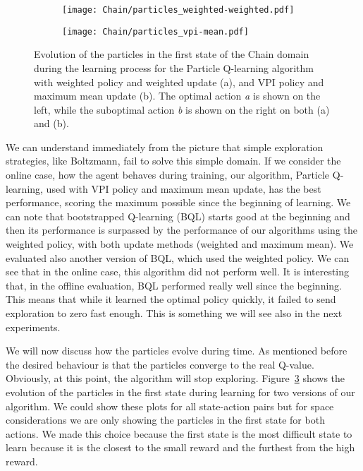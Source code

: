 \begin{figure}
\centering
\begin{subfigure}{\linewidth}
  \centering
  \texttt{[image: Chain/particles\_weighted-weighted.pdf]}
  \caption{}
  \label{fig:chain_particles_weighted_weighted}
\end{subfigure}%

\bigskip
\centering
\begin{subfigure}{\linewidth}
  \centering
  \texttt{[image: Chain/particles\_vpi-mean.pdf]}
   \caption{}
   \label{fig:chain_particles_vpi_mean}
\end{subfigure}
\caption{Evolution of the particles in the first state of the Chain domain during the learning process for the Particle Q-learning algorithm with weighted policy and weighted update (a), and VPI policy and maximum mean update (b). The optimal action \emph{a} is shown on the left, while the suboptimal action \emph{b} is shown on the right on both (a) and (b).}
\label{fig:chain_particle_evolution}
\end{figure}
We can understand immediately from the picture that simple exploration strategies, like Boltzmann, fail to solve this simple domain. If we consider the online case, \ie how the agent behaves during training, our algorithm, Particle Q-learning, used with VPI policy and maximum mean update, has the best performance, scoring the maximum possible since the beginning of learning. We can note that bootstrapped Q-learning (BQL) starts good at the beginning and then its performance is surpassed by the performance of our algorithms using the weighted policy, with both update methods (weighted and maximum mean). We evaluated also another version of BQL, which used the weighted policy. We can see that in the online case, this algorithm did not perform well. It is interesting that, in the offline evaluation, BQL performed really well since the beginning. This means that while it learned the optimal policy quickly, it failed to send exploration to zero fast enough. This is something we will see also in the next experiments.\par
We will now discuss how the particles evolve during time. As mentioned before the desired behaviour is that the particles converge to the real Q-value. Obviously, at this point, the algorithm will stop exploring. Figure~\ref{fig:chain_particle_evolution} shows the evolution of the particles in the first state during learning for two versions of our algorithm. We could show these plots for all state-action pairs but for space considerations we are only showing the particles in the first state for both actions. We made this choice because the first state is the most difficult state to learn because it is the closest to the small reward and the furthest from the high reward. \par
